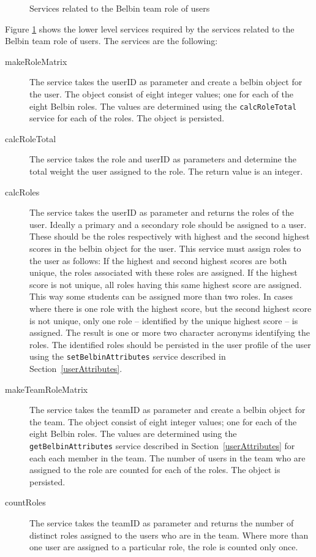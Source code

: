 \begin{figure}[htb]
\begin{center}
\end{center}
\caption{Services related to the Belbin team role of users \label{fig:belbin_functionalRequirements}}
\end{figure}

Figure \ref{fig:belbin_functionalRequirements} shows the lower level services required by the services related to the Belbin team role of users. The services are the following:
\begin{description}
\item[makeRoleMatrix] The service takes the userID as parameter and create a belbin object for the user. The object consist of eight integer values; one for each of the eight Belbin roles. The values are determined using the \texttt{calcRoleTotal} service for each of the roles. The object is persisted.
\item[calcRoleTotal] The service takes the role and userID as parameters and determine the total weight the user assigned to the role. The return value is an integer.
\item[calcRoles] The service takes the userID as parameter and returns the roles of the user.  Ideally a primary and a secondary role should be assigned to a user. These should be the roles respectively with highest and the second highest scores in the belbin object for the user.  This service must assign roles to the user as follows: If the highest and second highest scores are both unique, the roles associated with these roles are assigned. If the highest score is not unique, all roles having this same highest score are assigned. This way some students can be assigned more than two roles. In cases where there is one role with the highest score, but the second highest score is not unique, only one role -- identified by the unique highest score -- is assigned. The result is one or more two character acronyms identifying the roles. The identified roles should be persisted in the user profile of the user using the \texttt{setBelbinAttributes} service described in Section~\ref{userAttributes}.
\item[makeTeamRoleMatrix] The service takes the teamID as parameter and create a belbin object for the team. The object consist of eight integer values; one for each of the eight Belbin roles. The values are determined using the \texttt{getBelbinAttributes} service described in Section~\ref{userAttributes} for each each member in the team. The number of users in the team who are assigned to the role are counted for each of the roles. The object is persisted.
\item[countRoles] The service takes the teamID as parameter and returns the number of distinct roles assigned to the users who are in the team. Where more than one user are assigned to a particular role, the role is counted only once.
\end{description}  